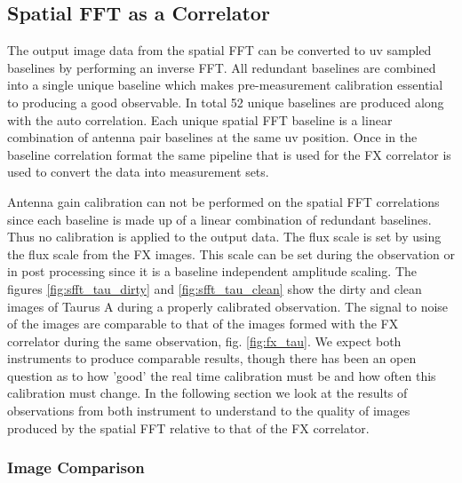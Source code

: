 \documentclass[useAMS,macros,usenatbib,onecolumn]{mn2e}
\begin{document}

\subsection{Spatial FFT as a Correlator}
\label{sfft_correlator}

The output image data from the spatial FFT can be converted to uv sampled baselines by performing an inverse FFT.
All redundant baselines are combined into a single unique baseline which makes pre-measurement calibration essential to producing a good observable.
In total 52 unique baselines are produced along with the auto correlation.
Each unique spatial FFT baseline is a linear combination of antenna pair baselines at the same uv position.
Once in the baseline correlation format the same pipeline that is used for the FX correlator is used to convert the data into measurement sets.

Antenna gain calibration can not be performed on the spatial FFT correlations since each baseline is made up of a linear combination of redundant baselines.
Thus no calibration is applied to the output data.
The flux scale is set by using the flux scale from the FX images.
This scale can be set during the observation or in post processing since it is a baseline independent amplitude scaling.
The figures \ref{fig:sfft_tau_dirty} and \ref{fig:sfft_tau_clean} show the dirty and clean images of Taurus A during a properly calibrated observation.
The signal to noise of the images are comparable to that of the images formed with the FX correlator during the same observation, fig. \ref{fig:fx_tau}.
We expect both instruments to produce comparable results, though there has been an open question as to how 'good' the real time calibration must be and how often this calibration must change.
In the following section we look at the results of observations from both instrument to understand to the quality of images produced by the spatial FFT relative to that of the FX correlator.

\subsubsection{Image Comparison}
\label{fx_sfft_image_comp}

\end{document}
